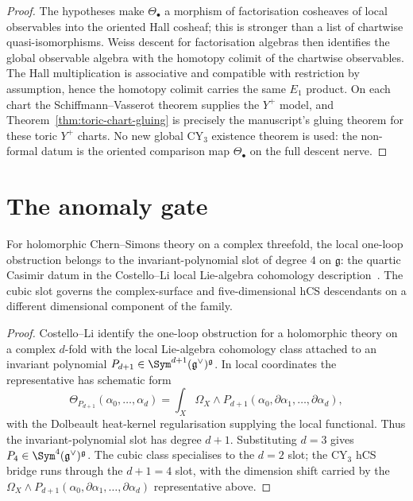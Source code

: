\begin{proof}
The hypotheses make $\Theta_\bullet$ a morphism of factorisation
cosheaves of local observables into the oriented Hall cosheaf; this is
stronger than a list of chartwise quasi-isomorphisms. Weiss descent for
factorisation algebras then identifies the global observable algebra
with the homotopy colimit of the chartwise observables. The Hall
multiplication is associative and compatible with restriction by
assumption, hence the homotopy colimit carries the same $E_1$ product.
On each chart the Schiffmann--Vasserot theorem supplies the $Y^+$ model,
and Theorem~\ref{thm:toric-chart-gluing} is precisely the manuscript's
gluing theorem for these toric $Y^+$ charts. No new global CY$_3$
existence theorem is used: the non-formal datum is the oriented
comparison map $\Theta_\bullet$ on the full descent nerve.
\end{proof}

\section{The anomaly gate}
\label{sec:cy3-chain-level-bridge-anomaly-gate}

\begin{proposition}
\label{prop:cy3-hcs-quartic-anomaly-slot}
For holomorphic Chern--Simons theory on a complex threefold, the local
one-loop obstruction belongs to the invariant-polynomial slot of degree
$4$ on $\mathfrak g$: the quartic Casimir datum in the Costello--Li
local Lie-algebra cohomology
description~\cite{CostelloLi2016, CostelloLi2020}. The cubic slot
governs the complex-surface and five-dimensional hCS descendants on a
different dimensional component of the family.
\end{proposition}

\begin{proof}
Costello--Li identify the one-loop obstruction for a holomorphic theory
on a complex $d$-fold with the local Lie-algebra cohomology class
attached to an invariant polynomial
$P_{d+1}\in\Sym^{d+1}(\mathfrak g^\vee)^{\mathfrak g}$. In local
coordinates the representative has schematic form
\[
 \Theta_{P_{d+1}}(\alpha_0,\ldots,\alpha_d)
 =
 \int_X\Omega_X\wedge
 P_{d+1}(\alpha_0,\partial\alpha_1,\ldots,\partial\alpha_d),
\]
with the Dolbeault heat-kernel regularisation supplying the local
functional. Thus the invariant-polynomial slot has degree $d+1$.
Substituting $d = 3$ gives
$P_4 \in \Sym^4(\mathfrak g^\vee)^{\mathfrak g}$. The cubic class
specialises to the $d = 2$ slot; the CY$_3$ hCS bridge runs through
the $d + 1 = 4$ slot, with the dimension shift carried by the
$\Omega_X \wedge P_{d+1}(\alpha_0, \partial\alpha_1, \ldots, \partial\alpha_d)$
representative above.
\end{proof}

